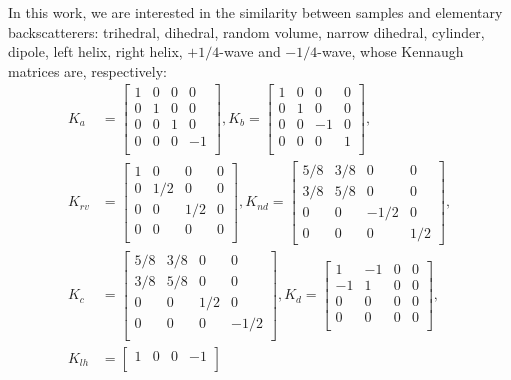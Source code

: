 \documentclass[conference]{IEEEtran}
\begin{document}
In this work, we are interested in the similarity between samples and elementary backscatterers:
trihedral, dihedral, random volume, narrow dihedral, cylinder, dipole, left helix, right helix, $+1/4$-wave and $-1/4$-wave, whose Kennaugh matrices are, respectively:
\begin{align*}
K_a &=
\begin{bmatrix}
1 & 0 & 0 & 0\\
0 & 1 & 0 & 0\\
0 & 0 & 1 & 0\\
0 & 0 & 0 & -1\\
\end{bmatrix},
K_b =
\begin{bmatrix}
1 & 0 & 0 & 0\\
0 & 1 & 0 & 0\\
0 & 0 & -1 & 0\\
0 & 0 & 0 & 1\\
\end{bmatrix},\\
K_{rv} &=
\begin{bmatrix}
1 & 0 & 0 & 0\\
0 & 1/2 & 0 & 0\\
0 & 0 & 1/2 & 0\\
0 & 0 & 0 & 0\\
\end{bmatrix},
K_{nd} =
\begin{bmatrix}
5/8 & 3/8 & 0 & 0\\
3/8 & 5/8 & 0 & 0\\
0 & 0 & -1/2 & 0\\
0 & 0 & 0 & 1/2
\end{bmatrix},\\
K_{c} &=
\begin{bmatrix}
5/8 & 3/8 & 0 & 0\\
3/8 & 5/8 & 0 & 0\\
0 & 0 & 1/2 & 0\\
0 & 0 & 0 & -1/2\\
\end{bmatrix},
K_d=
\begin{bmatrix}
1 & -1 & 0 & 0\\
-1 & 1 & 0 & 0\\
0 & 0 & 0 & 0\\
0 & 0 & 0 & 0\\
\end{bmatrix},\\
K_{lh} &=
\begin{bmatrix}
1 & 0 & 0 & -1\\

\end{bmatrix}
\end{align*}
\end{document}
